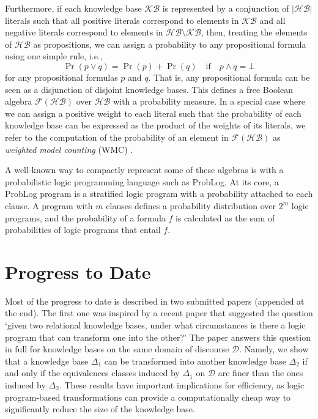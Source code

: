 \documentclass{article}
\begin{document}
Furthermore, if each knowledge base $\mathcal{KB}$ is represented by a
conjunction of $|\mathcal{HB}|$ literals such that all positive literals
correspond to elements in $\mathcal{KB}$ and all negative literals correspond to
elements in $\mathcal{HB} \setminus \mathcal{KB}$, then, treating the elements
of $\mathcal{HB}$ as propositions, we can assign a probability to any
propositional formula using one simple rule, i.e.,
\[
  \Pr(p \lor q) = \Pr(p) + \Pr(q) \quad \text{if} \quad p \land q = \bot
\]
for any propositional formulas $p$ and $q$. That is, any propositional formula
can be seen as a disjunction of disjoint knowledge bases. This defines a
free Boolean algebra $\mathscr{F}(\mathcal{HB})$ over $\mathcal{HB}$ with a
probability measure. In a special case where we can assign a positive weight to
each literal such that the probability of each knowledge base can be expressed
as the product of the weights of its literals, we refer to the computation of
the probability of an element in $\mathscr{F}(\mathcal{HB})$ as \emph{weighted
  model counting} (WMC) \cite{DBLP:journals/ai/ChaviraD08}.

A well-known way to compactly represent some of these algebras is with a
probabilistic logic programming language such as ProbLog. At its core, a ProbLog
program is a stratified logic program with a probability attached to each
clause. A program with $m$ clauses defines a probability distribution over $2^m$
logic programs, and the probability of a formula $f$ is calculated as the sum of
probabilities of logic programs that entail $f$.

\section{Progress to Date}

Most of the progress to date is described in two submitted papers (appended at
the end). The first one was inspired by a recent paper
\cite{DBLP:conf/ijcai/DumancicGMB19} that suggested the question `given two
relational knowledge bases, under what circumstances is there a logic program
that can transform one into the other?' The paper answers this question in full
for knowledge bases on the same domain of discourse $\mathcal{D}$. Namely, we
show that a knowledge base $\Delta_1$ can be transformed into another knowledge
base $\Delta_2$ if and only if the equivalences classes induced by $\Delta_1$ on
$\mathcal{D}$ are finer than the ones induced by $\Delta_2$. These results have
important implications for efficiency, as logic program-based transformations
can provide a computationally cheap way to significantly reduce the size of the
knowledge base.
\end{document}
